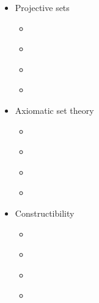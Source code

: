 \documentclass[letterpaper,10pt,english]{jupyterBook}
\begin{document}
\begin{itemize}
\item {} 
\sphinxAtStartPar
Projective sets

\begin{itemize}
\item {} 
\sphinxAtStartPar
{\hyperref[\detokenize{analytic::doc}]{}}

\item {} 
\sphinxAtStartPar
{\hyperref[\detokenize{regularityAnalytic::doc}]{}}

\item {} 
\sphinxAtStartPar
{\hyperref[\detokenize{projective::doc}]{}}

\item {} 
\sphinxAtStartPar
{\hyperref[\detokenize{coanalytic::doc}]{}}

\end{itemize}
\end{itemize}
\begin{itemize}
\item {} 
\sphinxAtStartPar
Axiomatic set theory

\begin{itemize}
\item {} 
\sphinxAtStartPar
{\hyperref[\detokenize{ZFC::doc}]{}}

\item {} 
\sphinxAtStartPar
{\hyperref[\detokenize{recursion::doc}]{}}

\item {} 
\sphinxAtStartPar
{\hyperref[\detokenize{models::doc}]{}}

\item {} 
\sphinxAtStartPar
{\hyperref[\detokenize{large_cardinals::doc}]{}}

\end{itemize}
\end{itemize}
\begin{itemize}
\item {} 
\sphinxAtStartPar
Constructibility

\begin{itemize}
\item {} 
\sphinxAtStartPar
{\hyperref[\detokenize{constructible::doc}]{}}

\item {} 
\sphinxAtStartPar
{\hyperref[\detokenize{V=L::doc}]{}}

\item {} 
\sphinxAtStartPar
{\hyperref[\detokenize{constructible-reals::doc}]{}}

\item {} 
\sphinxAtStartPar
{\hyperref[\detokenize{shoenfield::doc}]{}}

\end{itemize}
\end{itemize}
\end{document}
